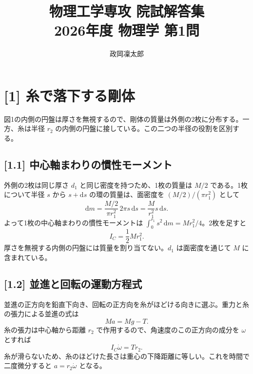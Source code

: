 \documentclass[11pt,a4paper]{article}
\title{物理工学専攻 院試解答集\\2026年度 物理学 第1問}
\author{政岡凜太郎}
\date{}
\begin{document}
\maketitle

\section*{[1] 糸で落下する剛体}
図1の内側の円盤は厚さを無視するので、剛体の質量は外側の2枚に分布する。一方、糸は半径 $r_2$ の内側の円盤に接している。この二つの半径の役割を区別する。

\begin{center}
\end{center}

\subsection*{[1.1] 中心軸まわりの慣性モーメント}
外側の2枚は同じ厚さ $d_1$ と同じ密度を持つため、1枚の質量は $M/2$ である。1枚について半径 $s$ から $s+\mathrm ds$ の環の質量は、面密度を $(M/2)/(\pi r_1^2)$ として
\[
\mathrm dm=\frac{M/2}{\pi r_1^2}\,2\pi s\,\mathrm ds
=\frac{M}{r_1^2}s\,\mathrm ds.
\]
よって1枚の中心軸まわりの慣性モーメントは $\int_0^{r_1}s^2\,\mathrm dm=Mr_1^2/4$。2枚を足すと
\[
\boxed{I_C=\frac12Mr_1^2}.
\]
厚さを無視する内側の円盤には質量を割り当てない。$d_1$ は面密度を通じて $M$ に含まれている。

\subsection*{[1.2] 並進と回転の運動方程式}
並進の正方向を鉛直下向き、回転の正方向を糸がほどける向きに選ぶ。重力と糸の張力による並進の式は
\[
\boxed{Ma=Mg-T}.
\]
糸の張力は中心軸から距離 $r_2$ で作用するので、角速度のこの正方向の成分を $\omega$ とすれば
\[
\boxed{I_C\dot\omega=Tr_2}.
\]
糸が滑らないため、糸のほどけた長さは重心の下降距離に等しい。これを時間で二度微分すると $\boxed{a=r_2\dot\omega}$ となる。
\end{document}
